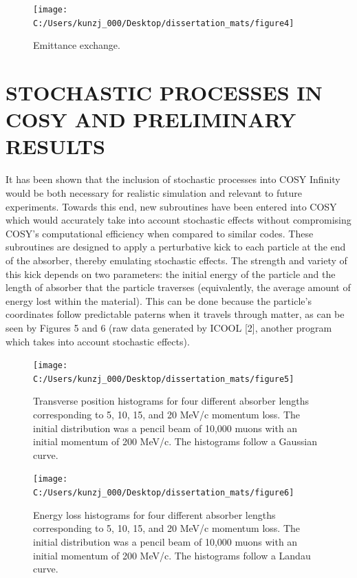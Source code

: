 \documentclass{jacow}
\begin{document}
\begin{figure}[h!]
\centering
\texttt{[image: C:/Users/kunzj\_000/Desktop/dissertation\_mats/figure4]}
\caption{Emittance exchange.}
\end{figure}


\section{STOCHASTIC PROCESSES IN COSY AND PRELIMINARY RESULTS}
It has been shown that the inclusion of stochastic processes into COSY Infinity would be both necessary for realistic simulation and relevant to future experiments. Towards this end, new subroutines have been entered into COSY which would accurately take into account stochastic effects without compromising COSY's computational efficiency when compared to similar codes. These subroutines are designed to apply a perturbative kick to each particle at the end of the absorber, thereby emulating stochastic effects. The strength and variety of this kick depends on two parameters: the initial energy of the particle and the length of absorber that the particle traverses (equivalently, the average amount of energy lost within the material). This can be done because the particle's coordinates follow predictable paterns when it travels through matter, as can be seen by Figures 5 and 6 (raw data generated by ICOOL [2], another program which takes into account stochastic effects). \par

\begin{figure}[h!]
\centering
\texttt{[image: C:/Users/kunzj\_000/Desktop/dissertation\_mats/figure5]}
\caption{Transverse position histograms for four different absorber lengths corresponding to 5, 10, 15, and 20 MeV/c momentum loss. The initial distribution was a pencil beam of 10,000 muons with an initial momentum of 200 MeV/c. The histograms follow a Gaussian curve.}
\end{figure}

\begin{figure}[h!]
\centering
\texttt{[image: C:/Users/kunzj\_000/Desktop/dissertation\_mats/figure6]}
\caption{Energy loss histograms for four different absorber lengths corresponding to 5, 10, 15, and 20 MeV/c momentum loss. The initial distribution was a pencil beam of 10,000 muons with an initial momentum of 200 MeV/c. The histograms follow a Landau curve.}
\end{figure}
\end{document}

